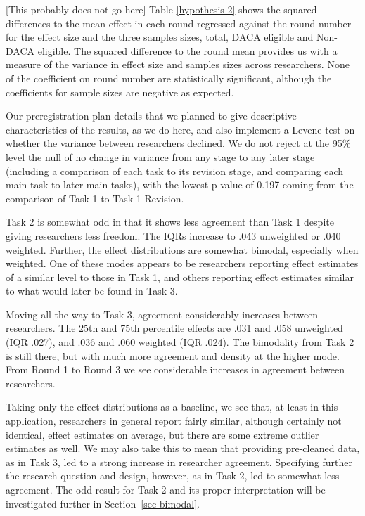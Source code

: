 \documentclass[
  letterpaper,
  DIV=11,
  numbers=noendperiod]{scrartcl}
\begin{document}
{[}This probably does not go here{]} Table \ref{hypothesis-2} shows the
squared differences to the mean effect in each round regressed against
the round number for the effect size and the three samples sizes, total,
DACA eligible and Non-DACA eligible. The squared difference to the round
mean provides us with a measure of the variance in effect size and
samples sizes across researchers. None of the coefficient on round
number are statistically significant, although the coefficients for
sample sizes are negative as expected.

Our preregistration plan details that we planned to give descriptive
characteristics of the results, as we do here, and also implement a
Levene test on whether the variance between researchers declined. We do
not reject at the 95\% level the null of no change in variance from any
stage to any later stage (including a comparison of each task to its
revision stage, and comparing each main task to later main tasks), with
the lowest p-value of 0.197 coming from the comparison of Task 1 to Task
1 Revision.

Task 2 is somewhat odd in that it shows less agreement than Task 1
despite giving researchers less freedom. The IQRs increase to .043
unweighted or .040 weighted. Further, the effect distributions are
somewhat bimodal, especially when weighted. One of these modes appears
to be researchers reporting effect estimates of a similar level to those
in Task 1, and others reporting effect estimates similar to what would
later be found in Task 3.

Moving all the way to Task 3, agreement considerably increases between
researchers. The 25th and 75th percentile effects are .031 and .058
unweighted (IQR .027), and .036 and .060 weighted (IQR .024). The
bimodality from Task 2 is still there, but with much more agreement and
density at the higher mode. From Round 1 to Round 3 we see considerable
increases in agreement between researchers.

Taking only the effect distributions as a baseline, we see that, at
least in this application, researchers in general report fairly similar,
although certainly not identical, effect estimates on average, but there
are some extreme outlier estimates as well. We may also take this to
mean that providing pre-cleaned data, as in Task 3, led to a strong
increase in researcher agreement. Specifying further the research
question and design, however, as in Task 2, led to somewhat less
agreement. The odd result for Task 2 and its proper interpretation will
be investigated further in Section~\ref{sec-bimodal}.
\end{document}
